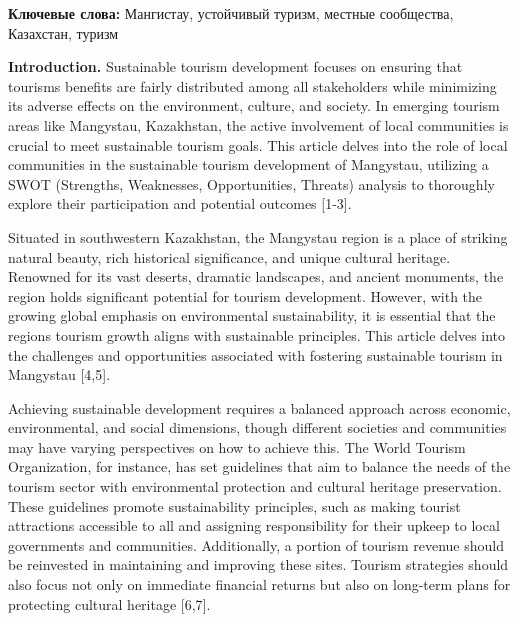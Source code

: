 {\bfseries Ключевые слова:} Мангистау, устойчивый туризм, местные
сообщества, Казахстан, туризм

{\bfseries Introduction.} Sustainable tourism development focuses on
ensuring that tourism\textquotesingle s benefits are fairly distributed
among all stakeholders while minimizing its adverse effects on the
environment, culture, and society. In emerging tourism areas like
Mangystau, Kazakhstan, the active involvement of local communities is
crucial to meet sustainable tourism goals. This article delves into the
role of local communities in the sustainable tourism development of
Mangystau, utilizing a SWOT (Strengths, Weaknesses, Opportunities,
Threats) analysis to thoroughly explore their participation and
potential outcomes {[}1-3{]}.

Situated in southwestern Kazakhstan, the Mangystau region is a place of
striking natural beauty, rich historical significance, and unique
cultural heritage. Renowned for its vast deserts, dramatic landscapes,
and ancient monuments, the region holds significant potential for
tourism development. However, with the growing global emphasis on
environmental sustainability, it is essential that the
region\textquotesingle s tourism growth aligns with sustainable
principles. This article delves into the challenges and opportunities
associated with fostering sustainable tourism in Mangystau {[}4,5{]}.

Achieving sustainable development requires a balanced approach across
economic, environmental, and social dimensions, though different
societies and communities may have varying perspectives on how to
achieve this. The World Tourism Organization, for instance, has set
guidelines that aim to balance the needs of the tourism sector with
environmental protection and cultural heritage preservation. These
guidelines promote sustainability principles, such as making tourist
attractions accessible to all and assigning responsibility for their
upkeep to local governments and communities. Additionally, a portion of
tourism revenue should be reinvested in maintaining and improving these
sites. Tourism strategies should also focus not only on immediate
financial returns but also on long-term plans for protecting cultural
heritage {[}6,7{]}.

